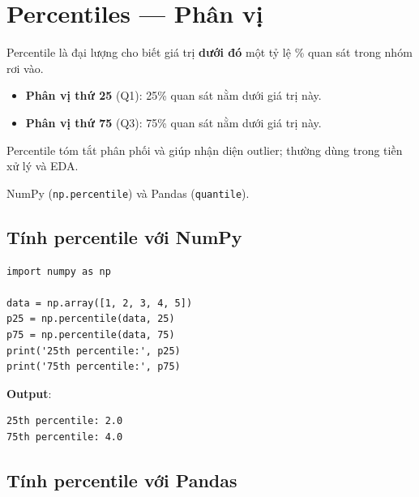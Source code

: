 \section{Percentiles --- Phân vị}
\label{sec:percentiles}

\begin{dinhnghia}[title={Percentile (phân vị)}]
Percentile là đại lượng cho biết giá trị \textbf{dưới đó} một tỷ lệ \% quan sát trong nhóm rơi vào.
\end{dinhnghia}

\begin{ynghia}[title={Ví dụ}]
\begin{itemize}
  \item \textbf{Phân vị thứ 25} (Q1): 25\% quan sát nằm dưới giá trị này.
  \item \textbf{Phân vị thứ 75} (Q3): 75\% quan sát nằm dưới giá trị này.
\end{itemize}
Percentile tóm tắt phân phối và giúp nhận diện outlier; thường dùng trong tiền xử lý và EDA.
\end{ynghia}

\begin{phuongphap}[title={Thư viện Python}]
NumPy (\texttt{np.percentile}) và Pandas (\texttt{quantile}).
\end{phuongphap}

\subsection{Tính percentile với NumPy}

\begin{vidu}[title={NumPy}]
\begin{lstlisting}
import numpy as np

data = np.array([1, 2, 3, 4, 5])
p25 = np.percentile(data, 25)
p75 = np.percentile(data, 75)
print('25th percentile:', p25)
print('75th percentile:', p75)
\end{lstlisting}

\textbf{Output}:
\begin{lstlisting}
25th percentile: 2.0
75th percentile: 4.0
\end{lstlisting}
\end{vidu}

\subsection{Tính percentile với Pandas}

